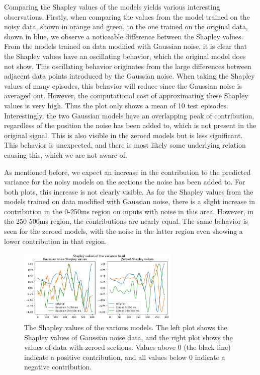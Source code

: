 Comparing the Shapley values of the models yields various interesting observations. Firstly, when comparing the values from the model trained on the noisy data, shown in orange and green, to the one trained on the original data, shown in blue, we observe a noticeable difference between the Shapley values. From the models trained on data modified with Gaussian noise, it is clear that the Shapley values have an oscillating behavior, which the original model does not show. This oscillating behavior originates from the large differences between adjacent data points introduced by the Gaussian noise. When taking the Shapley values of many episodes, this behavior will reduce since the Gaussian noise is averaged out. However, the computational cost of approximating these Shapley values is very high. Thus the plot only shows a mean of 10 test episodes. Interestingly, the two Gaussian models have an overlapping peak of contribution, regardless of the position the noise has been added to, which is not present in the original signal. This is also visible in the zeroed models but is less significant. This behavior is unexpected, and there is most likely some underlying relation causing this, which we are not aware of.

As mentioned before, we expect an increase in the contribution to the predicted variance for the noisy models on the sections the noise has been added to. For both plots, this increase is not clearly visible. As for the Shapley values from the models trained on data modified with Gaussian noise, there is a slight increase in contribution in the 0-250ms region on inputs with noise in this area. However, in the 250-500ms region, the contributions are nearly equal. The same behavior is seen for the zeroed models, with the noise in the latter region even showing a lower contribution in that region. 


\begin{figure}[!tbp]
    \centering
        \includegraphics[width=7.7cm]{img/shap.png}
    \caption{The Shapley values of the various models. The left plot shows the Shapley values of Gaussian noise data, and the right plot shows the values of data with zeroed sections. Values above 0 (the black line) indicate a positive contribution, and all values below 0 indicate a negative contribution.}
    \label{fig:shap}
\end{figure}
